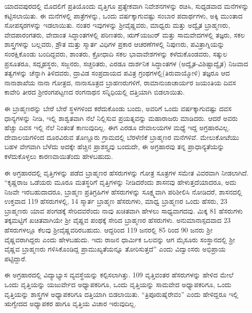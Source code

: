 ಯಾದವಪುರದಲ್ಲಿ ಮೊದಲಿಗೆ ಪ್ರತಿಯೊಂದು ವೃತ್ತಿಗೂ ಪ್ರತ್ಯೇಕವಾಗಿ ನಿವೇಶನಗಳನ್ನು ರಚಿಸಿ, ಸುಧೃಡವಾದ ಮನೆಗಳನ್ನು ಕಟ್ಟಿಸಲಾಯಿತು. ಈ ಮನೆಗಳಲ್ಲಿ ಪಾತ್ರೆಗಳನ್ನು, ಒಂದು ವರ್ಷಕ್ಕಾಗುವಷ್ಟು ಸಂಬಾರ ಪದಾರ್ಥಗಳು, ಅಕ್ಕಿ ಮುಂತಾದ ಸೋಪಸ್ಕರಗಳನ್ನು ಇಡಲಾಯಿತು. ನಂತರ ಇವುಗಳನ್ನು ಶ‍್ರೀವೈಷ್ಣವರು, ಮಾಧ್ವರು ಮತ್ತು ಅದ್ವೈತ ಬ್ರಾಹ್ಮಣರು, ವೇದಪಾರಂಗತರು, ವೇದಾಂತ ಸಿದ್ಧಾಂತಗಳಲ್ಲಿ ಪರಿಣತರು, ಋಗ್​ಯಜುರ್​ ಮತ್ತು ಸಾಮವೇದಗಳಲ್ಲಿ ತಜ್ಞರು, ಸಕಲ ಶಾಸ್ತ್ರಗಳನ್ನು ಬಲ್ಲವರು, ಶ್ರೌತ ಮತ್ತು ಸ್ಮಾರ್ತ ವಿಧಿಗಳ ಪ್ರಕಾರ ಆಚರಣೆಗಳಲ್ಲಿ ನಿಪುಣರು, ಪವಿತ್ರಾಗ್ನಿಯನ್ನು ಸಂರಕ್ಷಿಕೊಂಡು ಬಂದಿದ್ದವರು, ಶಾಂತರು, ಕ್ರೋಧಾದಿ ಸಕಲ ಭಾವಾವೇಶಗಳನ್ನು ಕಳೆದುಕೊಂಡವರು, ಸತ್ಕುಲ ಪ್ರಸೂತರೂ, ಸದ್ಗೃಹಸ್ಥರು, ಸಜ್ಜನರು, ಸಚ್ಚರಿತರು, ಎರಡೂ ದಾರ್ಶನಿಕ ಸಿದ್ಧಾಂತಗಳ (ಅದ್ವೈತ-ವಿಶಿಷ್ಟಾದ್ವೈತ) ನಿಜವಾದ ತತ್ವಗಳನ್ನು ಚೆನ್ನಾಗಿ ತಿಳಿದವರು, ದ್ರಾವಿಡ ಸಂಪ್ರದಾಯದ ಪವಿತ್ರ ಗ್ರಂಥಗಳಲ್ಲಿ(ತಿರುವಾಯ್ಮೋಳಿ) ತಜ್ಞರೂ ಆದ ನಾನಾಶಾಖೆಯ ನಾನಾ ಗೋತ್ರದ, ನಾನಾಸೂತ್ರದ ಬ್ರಾಹಣರುಗಳಿಗೆ, ರಾಮಾನುಜಾಚಾರ್ಯರ ಜಯಂತಿಯ ದಿವಸ ಕಾವೇರಿ ತೀರದ ಶ‍್ರೀರಂಗಪಟ್ಟಣದ ರಂಗನಾಥನ ಸನ್ನಿಧಿಯಲ್ಲಿ ದತ್ತಿಯಾಗಿ ಬಿಡಲಾಯಿತು.

ಈ ಬ್ರಾಹ್ಮಣರನ್ನು ಬೇರೆ ಬೇರೆ ಸ್ಥಳಗಳಿಂದ ಕರೆದುಕೊಂಡು ಬಂದು, ಅವರಿಗೆ ಒಂದು ವರ್ಷಕ್ಕಾಗುವಷ್ಟು ದವಸ ಧಾನ್ಯಗಳನ್ನು ನೀಡಿ, ಇಲ್ಲಿ ಶಾಶ್ವತವಾಗಿ ನೆಲೆ ನಿಲ್ಲಿಸುವ ಪ್ರಯತ್ನವನ್ನು ಮಹಾರಾಜರು ಮಾಡಿದರು. ಆದರೆ ಅವರು ಹೆಚ್ಚು ದಿವಸ ಇಲ್ಲಿ ನೆಲೆ ನಿಂತಂತೆ ಕಾಣುವುದಿಲ್ಲ. ಈಗ ಎರಡೂ ದೇವಾಲಯಗಳ ಮಧ್ಯೆ ಇದ್ದ ಅಗ್ರಹಾರವಿಲ್ಲ. ದೇವಾಲಯಗಳಿಂದ ದೂರವಿರುವ ತೊಣ್ಣೂರು ಗ್ರಾಮದಲ್ಲಿ ಬೆರಳೆಣಿಕೆ ಬ್ರಾಹ್ಮಣರ ಮನೆಗಳಿವೆ. ಮೇಲುಕೋಟೆಯು ಬಹಳ ವೇಗವಾಗಿ ಬೆಳೆದು ಅದಕ್ಕೇ ಹೆಚ್ಚಿನ ಪ್ರಾಶಸ್ತ್ಯವು ಬಂದುದೇ, ಈ ಅಗ್ರಹಾರವು ತನ್ನ ಪ್ರಾಧಾನ್ಯತೆಯನ್ನು ಕಳೆದುಕೊಳ್ಳಲು ಕಾರಣವಾಯಿತೆಂದು ಹೇಳಬಹುದು.

ಈ ಅಗ್ರಹಾರದಲ್ಲಿ ವೃತ್ತಿಗಳನ್ನು ಪಡೆದ ಬ್ರಾಹ್ಮಣರ ಹೆಸರುಗಳನ್ನು ಗೋತ್ರ ಸೂತ್ರಗಳ ಸಮೇತ ವಿವರವಾಗಿ ನೀಡಲಾಗಿದೆ. “ಕೃಷ್ಣರಾಜ ಒಡೆಯರು ಮೂರೂ ಮತಸ್ಥರಿಗೆ ವೃತ್ತಿಗಳನ್ನು ನೀಡಿದರೆಂದು ಶಾಸನವು ಹೇಳುತ್ತದೆಯಾದರೂ, ಅದು ನಿಜವೇ ಇರಬಹುದಾದರೂ, ಬ್ರಾಹ್ಮಣ ಪ್ರತಿಗ್ರಹಿಗಳ ಹೆಸರುಗಳನ್ನು ಸೂಕ್ಷ್ಮವಾಗಿ ಪರಿಶೀಲಿಸಿ ನೋಡಿದರೆ, ಶಾಸನದಲ್ಲಿ ಉಕ್ತವಾದ 119 ಹೆಸರುಗಳಲ್ಲಿ, 14 ಸ್ಮಾರ್ತ ಬ್ರಾಹ್ಮಣ ಹೆಸರುಗಳು, ಮಾಧ್ವ ಬ್ರಾಹ್ಮಣರ ಒಂದು ಹೆಸರು, 23 ಬ್ರಾಹ್ಮಣರು ಯಾವ ಪಂಗಡಕ್ಕೆ ಸೇರಿದವರೆಂದು ನಾವು ಖಚಿತವಾಗಿ ಹೇಳಲು ಸಾಧ್ಯವಾಗದವು. ಮಿಕ್ಕ 81 ಹೆಸರುಗಳು ತಕ್ಕಮಟ್ಟಿಗೆ ಖಚಿತವಾಗಿಯೇ ಶ‍್ರೀ ವೈಷ್ಣವ ಪಂಥಕ್ಕೆ ಸೇರಿದ ಬ್ರಾಹ್ಮಣರ ಹೆಸರುಗಳು. ಅನುಮಾನಾಸ್ಪದವಾದ 23 ಹೆಸರುಗಳಲ್ಲೂ ಕೆಲವು ಶ‍್ರೀವೈಷ್ಣವರಿರಬಹುದು. ಆದ್ದರಿಂದ 119 ಜನರಲ್ಲಿ 85 ರಿಂದ 90 ಜನರು ಶ‍್ರೀ ವೈಷ್ಣವರಾಗಿದ್ದರು ಎಂದು ಹೇಳಬಹುದು. ಇದು ರಾಜನ ಧಾರ್ಮಿಕ ಒಲವನ್ನು ಆಗ ಮೈಸೂರು ಸಂಸ್ಥಾನದಲ್ಲಿ ಶ‍್ರೀ ವೈಷ್ಣವ ಬ್ರಾಹ್ಮಣರು ಗಳಿಸಿಕೊಂಡಿದ್ದ ಪ್ರಾಮುಖ್ಯತೆಯನ್ನೂ ತೋರಿಸುತ್ತದೆ” ಎಂದು ವಿದ್ವಾಂಸರು ಅಭಿಪ್ರಾಯ ಪಟ್ಟಿದ್ದಾರೆ.

ಈ ಅಗ್ರಹಾರದಲ್ಲಿ ವಿದ್ಯಾಭ್ಯಾಸ ವ್ಯವಸ್ಥೆಯನ್ನು ಕಲ್ಪಿಸಲಾಗಿತ್ತು. 109 ವೃತ್ತಿವಂತರ ಹೆಸರುಗಳನ್ನು ಹೇಳಿದ ಮೇಲೆ ಒಂದು ವೃತ್ತಿಯನ್ನು ಯಜುರ್ವೇದ ಅಧ್ಯಾಪಕರಿಗೂ, ಒಂದು ವೃತ್ತಿಯನ್ನು ಸಾಮವೇದ ಅಧ್ಯಾಪಕರಿಗೂ, ಒಂದು ವೃತ್ತಿಯನ್ನು ಶಾಸ್ತ್ರಗಳ ಅಧ್ಯಾಪಕರಿಗೂ ದತ್ತಿಯಾಗಿ ಬಿಡಲಾಯಿತು. “ತ್ರಿಪೂರುಷೈರೇವಂ” ಎಂದು ಹೇಳಿದ್ದರೂ ಇಲ್ಲಿ ಋಗ್ವೇದದ ಅಧ್ಯಾಪಕರ ಹಾಗೂ ವೃತ್ತಿಯ ವಿಚಾರ ಇರುವುದಿಲ್ಲ.

